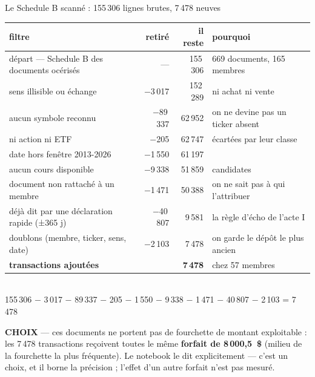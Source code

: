 \documentclass[11pt,aspectratio=169]{beamer}
\newcommand{\defl}[1]{{\scriptsize\color{black!55}#1}}
\newcommand{\choixbox}[1]{%
  \colorbox{alertred!8}{\parbox{\dimexpr\linewidth-8pt}{\scriptsize
    \textbf{\textcolor{alertred}{CHOIX}}\; --- #1}}}
\begin{document}
\begin{frame}{Le Schedule B scanné : 155\,306 lignes brutes, 7\,478 neuves}
  \centering\scriptsize
  \begin{tabular}{l r r l}
    \toprule
    filtre & retiré & il reste & pourquoi \\
    \midrule
    départ --- Schedule B des documents océrisés & --- & 155\,306 & \defl{669 documents, 165 membres} \\
    sens illisible ou échange       & $-$3\,017  & 152\,289 & \defl{ni achat ni vente} \\
    aucun symbole reconnu           & $-$89\,337 & 62\,952  & \defl{on ne devine pas un ticker absent} \\
    ni action ni ETF                & $-$205    & 62\,747  & \defl{écartées par leur classe} \\
    date hors fenêtre 2013-2026     & $-$1\,550  & 61\,197  & \\
    aucun cours disponible          & $-$9\,338  & 51\,859  & \defl{candidates} \\
    document non rattaché à un membre & $-$1\,471 & 50\,388 & \defl{on ne sait pas à qui l'attribuer} \\
    déjà dit par une déclaration rapide \defl{(±365 j)} & $-$40\,807 & 9\,581 & \defl{la règle d'écho de l'acte I} \\
    doublons (membre, ticker, sens, date) & $-$2\,103 & 7\,478 & \defl{on garde le dépôt le plus ancien} \\
    \midrule
    \textbf{transactions ajoutées} & & \textbf{7\,478} & \defl{chez 57 membres} \\
    \bottomrule
  \end{tabular}\\[1mm]
  \defl{155\,306 $-$ 3\,017 $-$ 89\,337 $-$ 205 $-$ 1\,550 $-$ 9\,338 $-$ 1\,471 $-$ 40\,807 $-$ 2\,103 = 7\,478}\\[2mm]

  \raggedright
  \choixbox{ces documents ne portent pas de fourchette de montant exploitable :
    les 7\,478 transactions reçoivent toutes le même \textbf{forfait de 8\,000,5~\$}
    (milieu de la fourchette la plus fréquente). Le notebook le dit explicitement --- c'est un choix,
    et il borne la précision ; l'effet d'un autre forfait n'est pas mesuré.}
\end{frame}
\end{document}
